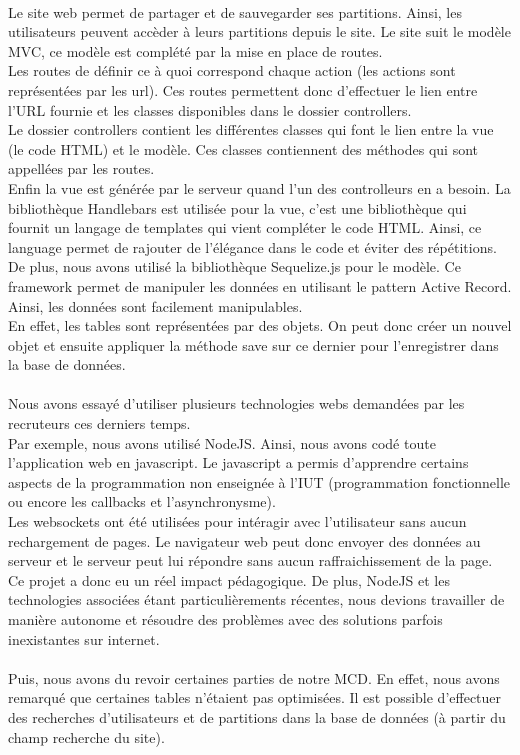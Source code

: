 \paragraph{}
Le site web permet de partager et de sauvegarder ses partitions.
Ainsi, les utilisateurs peuvent accèder à leurs partitions depuis le site.
Le site suit le modèle MVC, ce modèle est complété par la mise en place de routes. \\
Les routes de définir ce à quoi correspond chaque action (les actions sont représentées par les url). Ces routes permettent donc d'effectuer le lien entre l'URL fournie et les classes disponibles dans le dossier controllers. \\
Le dossier controllers contient les différentes classes qui font le lien entre la vue (le code HTML) et le modèle. Ces classes contiennent des méthodes qui sont appellées par les routes. \\
Enfin la vue est générée par le serveur quand l'un des controlleurs en a besoin. La bibliothèque Handlebars est utilisée pour la vue, c'est une bibliothèque qui fournit un langage de templates qui vient compléter le code HTML. Ainsi, ce language permet de rajouter de l'élégance dans le code et éviter des répétitions. \\
De plus, nous avons utilisé la bibliothèque Sequelize.js pour le modèle.
Ce framework permet de manipuler les données en utilisant le pattern Active Record. Ainsi, les données sont facilement manipulables. \\
En effet, les tables sont représentées par des objets. On peut donc créer un nouvel objet et ensuite appliquer la méthode save sur ce dernier pour l'enregistrer dans la base de données. \\
\paragraph{}
Nous avons essayé d'utiliser plusieurs technologies webs demandées par les recruteurs ces derniers temps. \\
Par exemple, nous avons utilisé NodeJS. Ainsi, nous avons codé toute l'application web en javascript. Le javascript a permis d'apprendre certains aspects de la programmation non enseignée à l'IUT (programmation fonctionnelle ou encore les callbacks et l'asynchronysme). \\
Les websockets ont été utilisées pour intéragir avec l'utilisateur sans aucun rechargement de pages. Le navigateur web peut donc envoyer des données au serveur et le serveur peut lui répondre sans aucun raffraichissement de la page. \\
Ce projet a donc eu un réel impact pédagogique. De plus, NodeJS et les technologies associées étant particulièrements récentes, nous devions travailler de manière autonome et résoudre des problèmes avec des solutions parfois inexistantes sur internet. \\
\\
Puis, nous avons du revoir certaines parties de notre MCD. 
En effet, nous avons remarqué que certaines tables n'étaient pas optimisées. Il est possible d'effectuer des recherches d'utilisateurs et de partitions dans la base de données (à partir du champ recherche du site).
